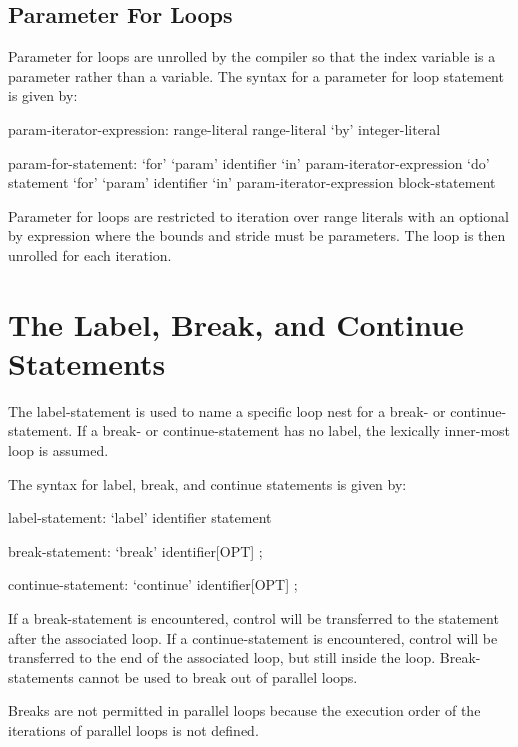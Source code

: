 \subsection{Parameter For Loops}
\label{Parameter_For_Loops}


Parameter for loops are unrolled by the compiler so that the index
variable is a parameter rather than a variable.  The syntax for a
parameter for loop statement is given by:
\begin{syntax}
param-iterator-expression:
  range-literal
  range-literal `by' integer-literal

param-for-statement:
  `for' `param' identifier `in' param-iterator-expression `do' statement
  `for' `param' identifier `in' param-iterator-expression block-statement
\end{syntax}
Parameter for loops are restricted to iteration over range literals
with an optional by expression where the bounds and stride must be
parameters.  The loop is then unrolled for each iteration.

\section{The Label, Break, and Continue Statements}
\label{Label_Break_Continue}

The label-statement is used to name a specific loop nest for a break-
or continue-statement.  If a break- or continue-statement has no
label, the lexically inner-most loop is assumed.

The syntax for label, break, and continue statements is given by:
\begin{syntax}
label-statement:
  `label' identifier statement

break-statement:
  `break' identifier[OPT] ;

continue-statement:
  `continue' identifier[OPT] ;
\end{syntax}

If a break-statement is encountered, control will be transferred to
the statement after the associated loop.  If a continue-statement is
encountered, control will be transferred to the end of the associated
loop, but still inside the loop.  Break-statements cannot be used to
break out of parallel loops.

\begin{rationale}
Breaks are not permitted in parallel loops because the execution order
of the iterations of parallel loops is not defined.
\end{rationale}

